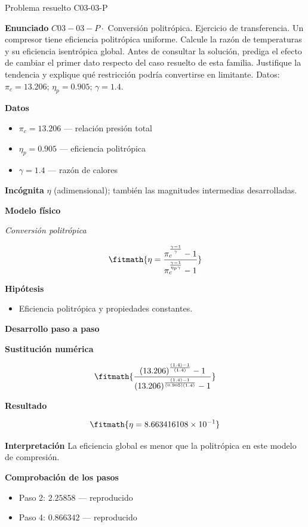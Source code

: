 \documentclass[10pt,openany]{book}
\begin{document}
\begin{studiumworked}{Problema resuelto C03-03-P}


\noindent\textbf{Enunciado}
\(C03-03-P \cdot\) Conversión politrópica. Ejercicio de transferencia. Un compresor tiene eficiencia politrópica uniforme. Calcule la razón de temperaturas y su eficiencia isentrópica global. Antes de consultar la solución, prediga el efecto de cambiar el primer dato respecto del caso resuelto de esta familia. Justifique la tendencia y explique qué restricción podría convertirse en limitante. Datos: \(\pi_c=13.206\); \(\eta_p=0.905\); \(\gamma=1.4\).

\noindent\textbf{Datos}
\begin{itemize}
\item $\pi_c = 13.206$ — relación presión total
\item $\eta_p = 0.905$ — eficiencia politrópica
\item $\gamma = 1.4$ — razón de calores
\end{itemize}

\noindent\textbf{Incógnita}
$\eta$ (adimensional); también las magnitudes intermedias desarrolladas.

\noindent\textbf{Modelo físico}

\noindent\textit{Conversión politrópica}

\[
\fitmath{\eta=\frac{\pi_c^{\frac{\gamma - 1}{\gamma}} - 1}{\pi_c^{\frac{\gamma - 1}{\eta_p \gamma}} - 1}}
\]

\noindent\textbf{Hipótesis}
\begin{itemize}
\item Eficiencia politrópica y propiedades constantes.
\end{itemize}

\noindent\textbf{Desarrollo paso a paso}



\noindent\textbf{Sustitución numérica}

\[
\fitmath{\frac{\left(13.206\right)^{\frac{\left(1.4\right) - 1}{\left(1.4\right)}} - 1}{\left(13.206\right)^{\frac{\left(1.4\right) - 1}{\left(0.905\right) \left(1.4\right)}} - 1}}
\]

\noindent\textbf{Resultado}

\[
\fitmath{\eta=8.663416108\times10^{-1}}
\]

\noindent\textbf{Interpretación}
La eficiencia global es menor que la politrópica en este modelo de compresión.

\noindent\textbf{Comprobación de los pasos}
\begin{itemize}
\item Paso 2: $2.25858$ — reproducido
\item Paso 4: $0.866342$ — reproducido
\end{itemize}


\end{studiumworked}
\end{document}
